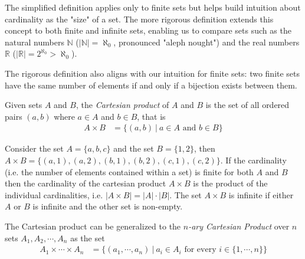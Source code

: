 

\noindent The simplified definition applies only to finite sets but helps build intuition about cardinality as the "size" of a set. The more rigorous definition extends this concept to both finite and infinite sets, enabling us to compare sets such as the natural numbers \(\mathbb{N}\) (\(|\mathbb{N}| = \aleph_0\), pronounced "aleph nought") and the real numbers \(\mathbb{R}\) (\(|\mathbb{R}| = 2^{\aleph_0} > \aleph_0\)). \\ \steezybreak

\noindent The rigorous definition also aligns with our intuition for finite sets: two finite sets have the same number of elements if and only if a bijection exists between them.

\begin{definition}
    Given sets $A$ and $B$, the \textit{Cartesian product} of $A$ and $B$ is the set of all ordered pairs $(a,b)$ where $a\in A$ and $b\in B$, that is 
    \begin{align}
        A\times B &= \{(a,b) \ | \ a\in A \text{ and } b\in B\} \nonumber
    \end{align} 
\end{definition}
Consider the set $A=\{a,b,c\}$ and the set $B=\{1,2\}$, then $A\times B =\{(a,1), (a,2), (b,1), (b,2), (c,1), (c,2)\}$. If the cardinality (i.e. the number of elements contained within a set) is finite for both $A$ and $B$ then the cardinality of the cartesian product $A\times B$ is the product of the individual cardinalities, i.e. $|A\times B| = |A|\cdot |B|$. The set $A\times B$ is infinite if either $A$ or $B$ is infinite and the other set is non-empty.
\begin{definition}
    The Cartesian product can be generalized to the \textit{$n$-ary Cartesian Product }over $n$ sets $A_1, A_2, \cdots, A_n$ as the set 
    \begin{align}
        A_1 \times \cdots \times A_n &= \{(a_1, \cdots, a_n ) \ | \ a_i \in A_i \text{ for every }i\in \{1, \cdots, n\}\} \nonumber
    \end{align}
\end{definition}

